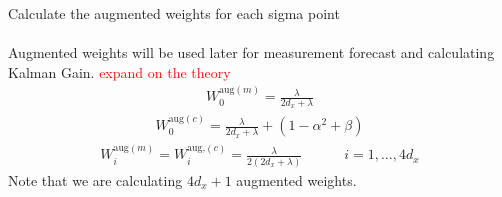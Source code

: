 \item Calculate the augmented weights for each sigma point \\ \\
    Augmented weights will be used later for measurement forecast and calculating Kalman Gain.
   \textcolor{red}{expand on the theory}
    \begin{align*}
        W^{\text{aug}(m)}_{0} = \frac{\lambda}{2d_{x}+ \lambda } 
        \end{align*}
         \begin{align*}
        W^{\text{aug}(c)}_{0} = \frac{\lambda}{2d_{x}+ \lambda} + (1 - \alpha^{2} + \beta) 
        \end{align*}
         \begin{align*}
        W^{\text{aug}(m)}_{i} = W^{\text{aug,}(c)}_{i} = \frac{\lambda}{2(2d_{x}+ \lambda) } \quad \quad \quad i=1,\dots,4d_{x} 
    \end{align*}
    Note that we are calculating $4d_x + 1$ augmented weights.

